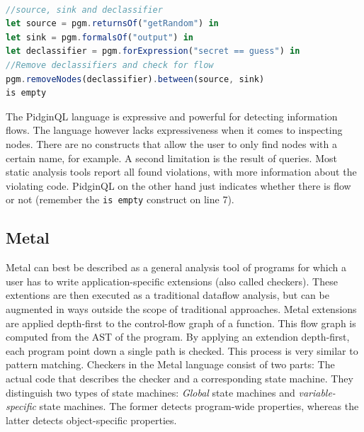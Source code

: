 \begin{lstlisting}[label={lst:PidginExample},language=JavaScript,caption=A typical PidginQL query,mathescape=true]  % float=t?

//source, sink and declassifier
let source = pgm.returnsOf("getRandom") in 			
let sink = pgm.formalsOf("output") in 				
let declassifier = pgm.forExpression("secret == guess") in
//Remove declassifiers and check for flow
pgm.removeNodes(declassifier).between(source, sink)	 		
is empty											
\end{lstlisting}

The PidginQL language is expressive and powerful for detecting information flows. The language however lacks expressiveness when it comes to inspecting nodes. There are no constructs that allow the user to only find nodes with a certain name, for example. A second limitation is the result of queries. Most static analysis tools report all found violations, with more information about the violating code. PidginQL on the other hand just indicates whether there is flow or not (remember the \texttt{is empty} construct on line 7).

\subsection*{Metal}

Metal\cite{Metal} can best be described as a general analysis tool of programs for which a user has to write application-specific extensions (also called checkers). These extentions are then executed as a traditional dataflow analysis, but can be augmented in ways outside the scope of traditional approaches. Metal extensions are applied depth-first to the control-flow graph of a function. This flow graph is computed from the AST of the program. By applying an extendion depth-first, each program point down a single path is checked. This process is very similar to pattern matching. Checkers in the Metal language consist of two parts: The actual code that describes the checker and a corresponding state machine. They distinguish two types of state machines: \textit{Global} state machines and \textit{variable-specific} state machines. The former detects program-wide properties, whereas the latter detects object-specific properties. 

